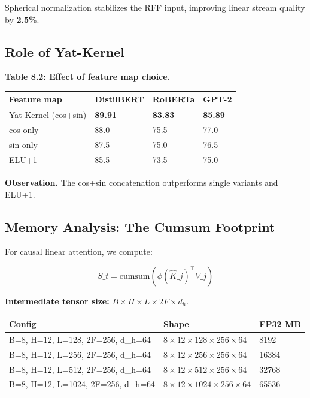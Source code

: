 Spherical normalization stabilizes the RFF input, improving linear stream 
quality by \textbf{2.5\%}.

\subsection{Role of Yat-Kernel}

\textbf{Table 8.2: Effect of feature map choice.}

\begin{table}[H]
\centering
\small
\begin{tabular}{llll}
\toprule
\textbf{Feature map} & \textbf{DistilBERT} & \textbf{RoBERTa} & \textbf{GPT-2} \\
\midrule
Yat-Kernel (cos+sin) & \textbf{89.91} & \textbf{83.83} & \textbf{85.89} \\
cos only & 88.0 & 75.5 & 77.0 \\
sin only & 87.5 & 75.0 & 76.5 \\
ELU+1 & 85.5 & 73.5 & 75.0 \\
\bottomrule
\end{tabular}
\end{table}

\textbf{Observation.} The cos+sin concatenation outperforms single variants and 
ELU+1.

\subsection{Memory Analysis: The Cumsum Footprint}

For causal linear attention, we compute:

\[
S\_t = \text{cumsum}(\phi(\hat{K}\_j)^\top V\_j)
\]

\textbf{Intermediate tensor size:} $B \times H \times L \times 2F \times d_h$.

\begin{table}[H]
\centering
\small
\begin{tabular}{lll}
\toprule
\textbf{Config} & \textbf{Shape} & \textbf{FP32 MB} \\
\midrule
B=8, H=12, L=128, 2F=256, d\_h=64 & $8 \times 12 \times 128 \times 256 \times 64$ & 8192 \\
B=8, H=12, L=256, 2F=256, d\_h=64 & $8 \times 12 \times 256 \times 256 \times 64$ & 16384 \\
B=8, H=12, L=512, 2F=256, d\_h=64 & $8 \times 12 \times 512 \times 256 \times 64$ & 32768 \\
B=8, H=12, L=1024, 2F=256, d\_h=64 & $8 \times 12 \times 1024 \times 256 \times 64$ & 65536 \\
\bottomrule
\end{tabular}
\end{table}

